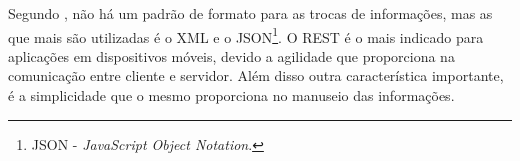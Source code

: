 	\par Segundo , não há um padrão de formato para as
trocas de informações, mas as que mais são utilizadas é o XML e o
JSON\footnote{JSON - \textit{JavaScript Object Notation}.}. O REST é o mais
indicado para aplicações em dispositivos móveis, devido a agilidade que 
proporciona na comunicação entre cliente e servidor. Além disso outra
característica importante, é a simplicidade que o mesmo proporciona no manuseio
das informações.
